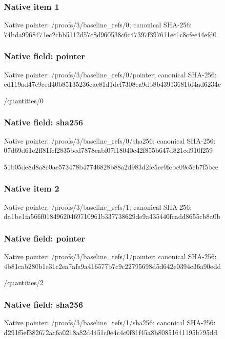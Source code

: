 \documentclass[10pt,a4paper]{article}
\begin{document}
\subsubsection{Native item 1}
Native pointer: /proofs/3/baseline\_\allowbreak{}refs/0; canonical SHA-256: 74bda9968471ec2cbb5112d57c8d960538c6c47397f397611ec1c8cfee44efd0

\subsubsection{Native field: pointer}
Native pointer: /proofs/3/baseline\_\allowbreak{}refs/0/pointer; canonical SHA-256: cd119ad47e9ced40b85135236eae81d1dcf7308ea9db8b43913681bf4ad6234c

\begingroup\raggedright\sloppy /\allowbreak{}quantities/\allowbreak{}0\par\endgroup

\subsubsection{Native field: sha256}
Native pointer: /proofs/3/baseline\_\allowbreak{}refs/0/sha256; canonical SHA-256: 07d69d61e2ff81fcf2835bed7878eabf07f18040c42f855b647d821cd910f259

\begingroup\raggedright\sloppy 51b05de8d8a8e0ae573478b47746828b88a2d983d2fe5ce9fcbc09c5eb7f5bce\par\endgroup

\subsubsection{Native item 2}
Native pointer: /proofs/3/baseline\_\allowbreak{}refs/1; canonical SHA-256: da1be1fa566f01849620469710961b337738629de9a435440fcadd8655cb8a0b

\subsubsection{Native field: pointer}
Native pointer: /proofs/3/baseline\_\allowbreak{}refs/1/pointer; canonical SHA-256: 4b81cab280b1e31c2ea7afa9a416577b7c9c22795698d5d642e0394c36a90edd

\begingroup\raggedright\sloppy /\allowbreak{}quantities/\allowbreak{}2\par\endgroup

\subsubsection{Native field: sha256}
Native pointer: /proofs/3/baseline\_\allowbreak{}refs/1/sha256; canonical SHA-256: d291f5ef382672ac6a0218a82d4451c0e4c4c0f81f45a8b80851641195b795dd
\end{document}
